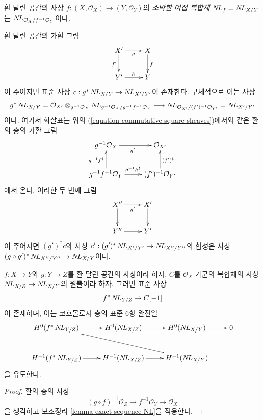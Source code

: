 \begin{definition}
\label{definition-cotangent-complex-morphism-ringed-topoi}
환 달린 공간의 사상
$f : (X, \mathcal{O}_X) \to (Y, \mathcal{O}_Y)$의
{\it 소박한 여접 복합체} $\mathop{N\!L}\nolimits_f = \mathop{N\!L}\nolimits_{X/Y}$는
$\mathop{N\!L}\nolimits_{\mathcal{O}_X/f^{-1}\mathcal{O}_Y}$이다.
\end{definition}

\noindent
환 달린 공간의 가환 그림
$$
\xymatrix{
X' \ar[r]_g \ar[d]_{f'} & X \ar[d]^f \\
Y' \ar[r]^h & Y
}
$$
이 주어지면 표준 사상 $c : g^*\mathop{N\!L}\nolimits_{X/Y} \to \mathop{N\!L}\nolimits_{X'/Y'}$이 존재한다.
구체적으로 이는 사상
$$
g^*\mathop{N\!L}\nolimits_{X/Y} =
\mathcal{O}_{X'} \otimes_{g^{-1}\mathcal{O}_X}
\mathop{N\!L}\nolimits_{g^{-1}\mathcal{O}_X/g^{-1}f^{-1}\mathcal{O}_Y}
\longrightarrow
\mathop{N\!L}\nolimits_{\mathcal{O}_{X'}/(f')^{-1}\mathcal{O}_{Y'}} = \mathop{N\!L}\nolimits_{X'/Y'}
$$
이다. 여기서 화살표는 위의
(\ref{equation-commutative-square-sheaves})에서와 같은 환의 층의 가환 그림
$$
\xymatrix{
g^{-1}\mathcal{O}_X \ar[r]_{g^\sharp} &
\mathcal{O}_{X'} \\
g^{-1}f^{-1}\mathcal{O}_Y
\ar[r]^{g^{-1}h^\sharp}
\ar[u]^{g^{-1}f^\sharp} &
(f')^{-1}\mathcal{O}_{Y'} \ar[u]_{(f')^\sharp}
}
$$
에서 온다. 이러한 두 번째 그림
$$
\xymatrix{
X'' \ar[r]_{g'} \ar[d] & X' \ar[d] \\
Y'' \ar[r] & Y'
}
$$
이 주어지면 $(g')^*c$와 사상
$c' : (g')^*\mathop{N\!L}\nolimits_{X'/Y'} \to \mathop{N\!L}\nolimits_{X''/Y''}$의 합성은 사상
$(g \circ g')^*\mathop{N\!L}\nolimits_{X''/Y''} \to \mathop{N\!L}\nolimits_{X/Y}$이다.

\begin{lemma}
\label{lemma-exact-sequence-NL-ringed-topoi}
$f : X \to Y$와 $g : Y \to Z$를 환 달린 공간의 사상이라 하자.
$C$를 $\mathcal{O}_X$-가군의 복합체의 사상
$\mathop{N\!L}\nolimits_{X/Z} \to \mathop{N\!L}\nolimits_{X/Y}$의 원뿔이라 하자. 그러면 표준 사상
$$
f^*\mathop{N\!L}\nolimits_{Y/Z} \to C[-1]
$$
이 존재하며, 이는 코호몰로지 층의 표준 6항 완전열
$$
\xymatrix{
H^0(f^*\NL_{Y/Z}) \ar[r] &
H^0(\NL_{X/Z}) \ar[r] &
H^0(\NL_{X/Y}) \ar[r] &
0 \\
H^{-1}(f^*\NL_{Y/Z}) \ar[r] &
H^{-1}(\NL_{X/Z}) \ar[r] &
H^{-1}(\NL_{X/Y}) \ar[llu]
}
$$
을 유도한다.
\end{lemma}

\begin{proof}
환의 층의 사상
$$
(g \circ f)^{-1}\mathcal{O}_Z \to f^{-1}\mathcal{O}_Y \to \mathcal{O}_X
$$
을 생각하고 보조정리 \ref{lemma-exact-sequence-NL}을 적용한다.
\end{proof}













